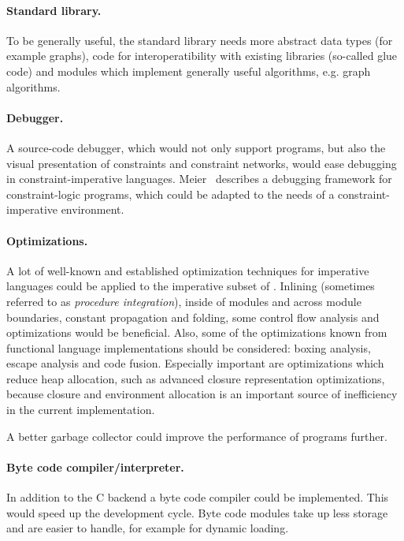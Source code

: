 \paragraph{Standard library.}
To be generally useful, the standard library needs more abstract data
types (for example graphs), code for interoperatibility with existing
libraries (so-called glue code) and modules which implement generally
useful algorithms, e.g. graph algorithms.

\paragraph{Debugger.}
 A source-code debugger, which would not only support
\turtle{} programs, but also the visual presentation of constraints
and constraint networks, would ease debugging in constraint-imperative
languages. Meier~\cite{meier95debugging} describes a debugging
framework for constraint-logic programs, which could be adapted to the
needs of a constraint-imperative environment.

\paragraph{Optimizations.}
%
A lot of well-known and established optimization techniques for
imperative languages could be applied to the imperative subset of
\turtle{}.  Inlining (sometimes referred to as {\em procedure
  integration}), inside of modules and across module boundaries,
constant propagation and folding, some control flow analysis and
optimizations would be beneficial.  Also, some of the optimizations
known from functional language implementations should be considered:
boxing analysis, escape analysis and code fusion.  Especially
important are optimizations which reduce heap allocation, such as
advanced closure representation optimizations, because closure and
environment allocation is an important source of inefficiency in the
current implementation.

A better garbage collector could improve the performance of \turtle{}
programs further.

\paragraph{Byte code compiler/interpreter.}
%
In addition to the C backend a byte code compiler could be
implemented.  This would speed up the development cycle.  Byte code
modules take up less storage and are easier to handle, for example for
dynamic loading.

